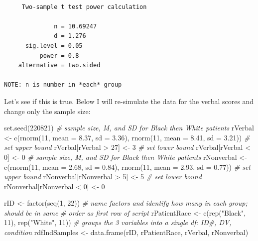 \documentclass[
  11pt,
]{book}
\newenvironment{Shaded}{\begin{snugshade}}{\end{snugshade}}
\newcommand{\AttributeTok}[1]{\textcolor[rgb]{0.77,0.63,0.00}{#1}}
\newcommand{\CommentTok}[1]{\textcolor[rgb]{0.56,0.35,0.01}{\textit{#1}}}
\newcommand{\DecValTok}[1]{\textcolor[rgb]{0.00,0.00,0.81}{#1}}
\newcommand{\FloatTok}[1]{\textcolor[rgb]{0.00,0.00,0.81}{#1}}
\newcommand{\FunctionTok}[1]{\textcolor[rgb]{0.00,0.00,0.00}{#1}}
\newcommand{\NormalTok}[1]{#1}
\newcommand{\OtherTok}[1]{\textcolor[rgb]{0.56,0.35,0.01}{#1}}
\newcommand{\SpecialCharTok}[1]{\textcolor[rgb]{0.00,0.00,0.00}{#1}}
\newcommand{\StringTok}[1]{\textcolor[rgb]{0.31,0.60,0.02}{#1}}
\begin{document}
\begin{verbatim}

     Two-sample t test power calculation 

              n = 10.69247
              d = 1.276
      sig.level = 0.05
          power = 0.8
    alternative = two.sided

NOTE: n is number in *each* group
\end{verbatim}

Let's see if this is true. Below I will re-simulate the data for the verbal scores and change only the sample size:

\begin{Shaded}
\begin{Highlighting}[]
\FunctionTok{set.seed}\NormalTok{(}\DecValTok{220821}\NormalTok{)}
\CommentTok{\# sample size, M, and SD for Black then White patients}
\NormalTok{rVerbal }\OtherTok{\textless{}{-}} \FunctionTok{c}\NormalTok{(}\FunctionTok{rnorm}\NormalTok{(}\DecValTok{11}\NormalTok{, }\AttributeTok{mean =} \FloatTok{8.37}\NormalTok{, }\AttributeTok{sd =} \FloatTok{3.36}\NormalTok{), }\FunctionTok{rnorm}\NormalTok{(}\DecValTok{11}\NormalTok{, }\AttributeTok{mean =} \FloatTok{8.41}\NormalTok{,}
    \AttributeTok{sd =} \FloatTok{3.21}\NormalTok{))}
\CommentTok{\# set upper bound}
\NormalTok{rVerbal[rVerbal }\SpecialCharTok{\textgreater{}} \DecValTok{27}\NormalTok{] }\OtherTok{\textless{}{-}} \DecValTok{3}
\CommentTok{\# set lower bound}
\NormalTok{rVerbal[rVerbal }\SpecialCharTok{\textless{}} \DecValTok{0}\NormalTok{] }\OtherTok{\textless{}{-}} \DecValTok{0}
\CommentTok{\# sample size, M, and SD for Black then White patients}
\NormalTok{rNonverbal }\OtherTok{\textless{}{-}} \FunctionTok{c}\NormalTok{(}\FunctionTok{rnorm}\NormalTok{(}\DecValTok{11}\NormalTok{, }\AttributeTok{mean =} \FloatTok{2.68}\NormalTok{, }\AttributeTok{sd =} \FloatTok{0.84}\NormalTok{), }\FunctionTok{rnorm}\NormalTok{(}\DecValTok{11}\NormalTok{, }\AttributeTok{mean =} \FloatTok{2.93}\NormalTok{,}
    \AttributeTok{sd =} \FloatTok{0.77}\NormalTok{))}
\CommentTok{\# set upper bound}
\NormalTok{rNonverbal[rNonverbal }\SpecialCharTok{\textgreater{}} \DecValTok{5}\NormalTok{] }\OtherTok{\textless{}{-}} \DecValTok{5}
\CommentTok{\# set lower bound}
\NormalTok{rNonverbal[rNonverbal }\SpecialCharTok{\textless{}} \DecValTok{0}\NormalTok{] }\OtherTok{\textless{}{-}} \DecValTok{0}

\NormalTok{rID }\OtherTok{\textless{}{-}} \FunctionTok{factor}\NormalTok{(}\FunctionTok{seq}\NormalTok{(}\DecValTok{1}\NormalTok{, }\DecValTok{22}\NormalTok{))}
\CommentTok{\# name factors and identify how many in each group; should be in same}
\CommentTok{\# order as first row of script}
\NormalTok{rPatientRace }\OtherTok{\textless{}{-}} \FunctionTok{c}\NormalTok{(}\FunctionTok{rep}\NormalTok{(}\StringTok{"Black"}\NormalTok{, }\DecValTok{11}\NormalTok{), }\FunctionTok{rep}\NormalTok{(}\StringTok{"White"}\NormalTok{, }\DecValTok{11}\NormalTok{))}
\CommentTok{\# groups the 3 variables into a single df: ID\#, DV, condition}
\NormalTok{rdfIndSamples }\OtherTok{\textless{}{-}} \FunctionTok{data.frame}\NormalTok{(rID, rPatientRace, rVerbal, rNonverbal)}


\end{Highlighting}
\end{Shaded}
\end{document}
